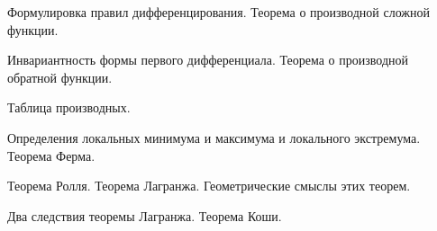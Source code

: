 \begin{problem}Формулировка правил дифференцирования. Теорема о производной сложной функции.
\end{problem}
\begin{problem}Инвариантность формы первого дифференциала. Теорема о производной обратной
функции.
\end{problem}
\begin{problem}Таблица производных.
\end{problem}
\begin{problem}Определения локальных минимума и максимума и локального экстремума. Теорема
Ферма.
\end{problem}
\begin{problem}Теорема Ролля. Теорема Лагранжа. Геометрические смыслы этих теорем.
\end{problem}
\begin{problem}Два следствия теоремы Лагранжа. Теорема Коши.\end{problem}